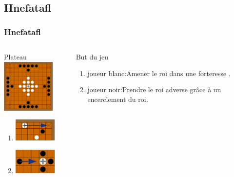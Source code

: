 \documentclass[11pt]{beamer}
\begin{document}
  \subsection[Hnefatafl]{Hnefatafl}
\begin{frame}

\frametitle{Hnefatafl}
\subtitle{Hnefatafl}
\begin{columns}[t]
\begin{column}{4cm}
	\begin{block}{Plateau}
	\centering \includegraphics[width=75pt]{images/tafel.png}
	\begin{enumerate}
		\item \centering \includegraphics[width=60pt]{images/roi2.png}\\
		\item \centering \includegraphics[width=60pt]{images/roi1.png}
	\end{enumerate}
	\end{block} 
\end{column}

\begin{column}{6cm}
	\begin{alertblock}{But du jeu}
		\begin{enumerate}
			\item joueur blanc:Amener le roi dans une forteresse .
			\item joueur noir:Prendre le roi adverse grâce à un encerclement du roi.
		\end{enumerate}
	\end{alertblock}   
\end{column}
\end{columns}  
\end{frame}
\end{document}

